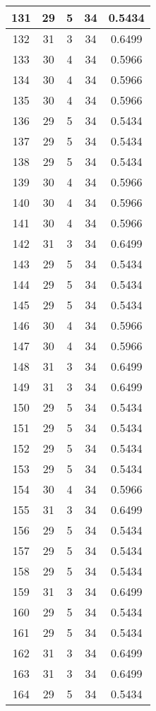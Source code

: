 \documentclass[letterpaper, 12pt]{article}
\begin{document}
\begin{longtable}{|c|c|c|c|c|}
\hline
131 & 29 & 5 & 34 & 0.5434 \\
\hline
132 & 31 & 3 & 34 & 0.6499 \\
\hline
133 & 30 & 4 & 34 & 0.5966 \\
\hline
134 & 30 & 4 & 34 & 0.5966 \\
\hline
135 & 30 & 4 & 34 & 0.5966 \\
\hline
136 & 29 & 5 & 34 & 0.5434 \\
\hline
137 & 29 & 5 & 34 & 0.5434 \\
\hline
138 & 29 & 5 & 34 & 0.5434 \\
\hline
139 & 30 & 4 & 34 & 0.5966 \\
\hline
140 & 30 & 4 & 34 & 0.5966 \\
\hline
141 & 30 & 4 & 34 & 0.5966 \\
\hline
142 & 31 & 3 & 34 & 0.6499 \\
\hline
143 & 29 & 5 & 34 & 0.5434 \\
\hline
144 & 29 & 5 & 34 & 0.5434 \\
\hline
145 & 29 & 5 & 34 & 0.5434 \\
\hline
146 & 30 & 4 & 34 & 0.5966 \\
\hline
147 & 30 & 4 & 34 & 0.5966 \\
\hline
148 & 31 & 3 & 34 & 0.6499 \\
\hline
149 & 31 & 3 & 34 & 0.6499 \\
\hline
150 & 29 & 5 & 34 & 0.5434 \\
\hline
151 & 29 & 5 & 34 & 0.5434 \\
\hline
152 & 29 & 5 & 34 & 0.5434 \\
\hline
153 & 29 & 5 & 34 & 0.5434 \\
\hline
154 & 30 & 4 & 34 & 0.5966 \\
\hline
155 & 31 & 3 & 34 & 0.6499 \\
\hline
156 & 29 & 5 & 34 & 0.5434 \\
\hline
157 & 29 & 5 & 34 & 0.5434 \\
\hline
158 & 29 & 5 & 34 & 0.5434 \\
\hline
159 & 31 & 3 & 34 & 0.6499 \\
\hline
160 & 29 & 5 & 34 & 0.5434 \\
\hline
161 & 29 & 5 & 34 & 0.5434 \\
\hline
162 & 31 & 3 & 34 & 0.6499 \\
\hline
163 & 31 & 3 & 34 & 0.6499 \\
\hline
164 & 29 & 5 & 34 & 0.5434 \\

\end{longtable}
\end{document}
